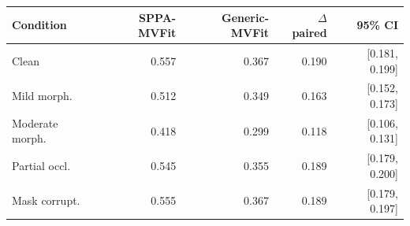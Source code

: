 \begin{tabular}{@{}lrrrr@{}}
\toprule
Condition & SPPA-MVFit & Generic-MVFit & $\Delta$ paired & 95\% CI \\
\midrule
Clean & 0.557 & 0.367 & 0.190 & [0.181, 0.199] \\
Mild morph. & 0.512 & 0.349 & 0.163 & [0.152, 0.173] \\
Moderate morph. & 0.418 & 0.299 & 0.118 & [0.106, 0.131] \\
Partial occl. & 0.545 & 0.355 & 0.189 & [0.179, 0.200] \\
Mask corrupt. & 0.555 & 0.367 & 0.189 & [0.179, 0.197] \\
\bottomrule
\end{tabular}
